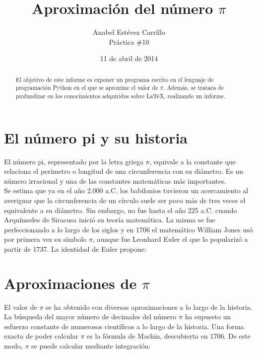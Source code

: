 \documentclass[spanish,a4paper,11pt]{article}
\begin{document}
\title{Aproximación del número $\pi$}
\author{Anabel Estévez Carrillo \\ Práctica \#10}
\date{11 de abril de 2014}

\maketitle

\begin{abstract}
El objetivo de este informe es exponer un programa escrito en el lenguaje de programación Python en el que se aproxime 
el valor de $\pi$. Además, se tratara de profundizar en los conocimientos adquiridos sobre \LaTeX{}, realizando un informe.
\end{abstract}


\section{El número pi y su historia}

El número pi, representado por la letra griega $\pi$, equivale a la constante que relaciona el perímetro o longitud de una 
circunferencia con su diámetro. Es un número irracional y una de las constantes matemáticas más importantes. \\
Se estima que ya en el año 2.000 a.C. los babilonios tuvieron un acercamiento al averiguar que la circunferencia de un 
círculo suele ser poco más de tres veces el equivalente a su diámetro. Sin embargo, no fue hasta el año 225 a.C. cuando 
Arquímedes de Siracusa inició su teoría matemática. La misma se fue perfeccionando a lo largo de los siglos y en 
1706 el matemático William Jones usó por primera vez su símbolo $\pi$, aunque fue Leonhard Euler el que lo popularizó
 a partir de 1737. La identidad de Euler propone: 


\section{Aproximaciones de $\pi$}

El valor de $\pi$ se ha obtenido con diversas aproximaciones a lo largo de la historia. La búsqueda del mayor número de 
decimales del número $\pi$ ha supuesto un esfuerzo constante de numerosos científicos a lo largo de la historia.
Una forma exacta de poder calcular $\pi$ es la fórmula de Machin, descubierta en 1706. De este modo, 
$\pi$ se puede calcular mediante integración:
\end{document}
